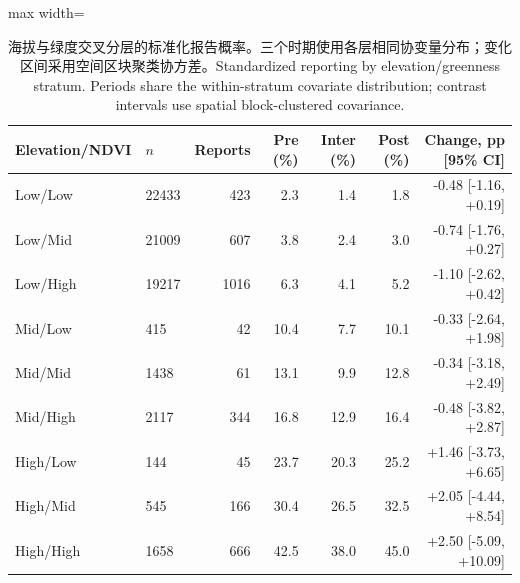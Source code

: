 \begin{table}[htbp]\centering\footnotesize
\caption{\ifzh 海拔与绿度交叉分层的标准化报告概率。三个时期使用各层相同协变量分布；变化区间采用空间区块聚类协方差。\else Standardized reporting by elevation/greenness stratum. Periods share the within-stratum covariate distribution; contrast intervals use spatial block-clustered covariance.\fi}\label{tab:envrebound}
\begin{adjustbox}{max width=\linewidth}\begin{tabular}{llrrrrr}\toprule
Elevation/NDVI & $n$ & Reports & Pre (\%) & Inter (\%) & Post (\%) & Change, pp [95\% CI] \\ \midrule
Low/Low & 22433 & 423 & 2.3 & 1.4 & 1.8 & -0.48 [-1.16, +0.19] \\
Low/Mid & 21009 & 607 & 3.8 & 2.4 & 3.0 & -0.74 [-1.76, +0.27] \\
Low/High & 19217 & 1016 & 6.3 & 4.1 & 5.2 & -1.10 [-2.62, +0.42] \\
Mid/Low & 415 & 42 & 10.4 & 7.7 & 10.1 & -0.33 [-2.64, +1.98] \\
Mid/Mid & 1438 & 61 & 13.1 & 9.9 & 12.8 & -0.34 [-3.18, +2.49] \\
Mid/High & 2117 & 344 & 16.8 & 12.9 & 16.4 & -0.48 [-3.82, +2.87] \\
High/Low & 144 & 45 & 23.7 & 20.3 & 25.2 & +1.46 [-3.73, +6.65] \\
High/Mid & 545 & 166 & 30.4 & 26.5 & 32.5 & +2.05 [-4.44, +8.54] \\
High/High & 1658 & 666 & 42.5 & 38.0 & 45.0 & +2.50 [-5.09, +10.09] \\
\bottomrule\end{tabular}\end{adjustbox}

\end{table}
